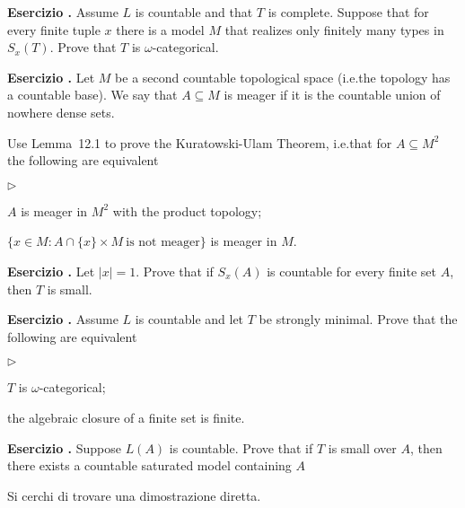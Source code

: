 \documentclass[10pt]{article}
\newcommand{\labella}[1]{{\sf\footnotesize #1}\hfill}
\renewenvironment{itemize}
  {\begin{list}{$\triangleright$}{%
   \setlength{\parskip}{0mm}
   \setlength{\topsep}{0mm}
   \setlength{\rightmargin}{0mm}
   \setlength{\listparindent}{0mm}
   \setlength{\itemindent}{0mm}
   \setlength{\labelwidth}{3ex}
   \setlength{\itemsep}{0mm}
   \setlength{\parsep}{0mm}
   \setlength{\partopsep}{0mm}
   \setlength{\labelsep}{1ex}
   \setlength{\leftmargin}{\labelwidth+\labelsep}
   \let\makelabel\labella}}{%
   \end{list}}
\newcounter{ex}
\newenvironment{exercise}{\clearpage\addtocounter{ex}{1}\textbf{Esercizio \theex.\quad}}{}
\begin{document}
\begin{exercise} 
Assume $L$ is countable and that $T$ is complete.
Suppose that for every finite tuple $x$ there is a model $M$ that realizes only finitely many types in $S_x(T)$.
Prove that $T$ is $\omega$-categorical.
\end{exercise}


\clearpage%
\setcounter{ex}{0}


\begin{exercise}
Let $M$ be a second countable topological space (i.e.\@ the topology has a countable base).
We say that $A\subseteq M$ is meager if it is the countable union of nowhere dense sets.

Use Lemma~12.1 to prove the Kuratowski-Ulam Theorem, i.e.\@ that for $A\subseteq M^2$ the following are equivalent
\begin{itemize}
\item[1.] $A$ is meager in $M^2$  with the product topology;
\item[2.] $\Big\{x\in M : A\cap \{x\}{\times}M \ \textrm{is not meager}\Big\}$ is meager in $M$.
\end{itemize}
\end{exercise}



\begin{exercise}
Let $|x|=1$.
Prove that if $S_x(A)$ is countable for every finite set $A$, then $T$ is small.
\end{exercise}



\begin{exercise} 
Assume $L$ is countable and let $T$ be strongly minimal.
Prove that the following are equivalent
\begin{itemize}
\item[1.] $T$ is $\omega$-categorical;
\item[2.] the algebraic closure of a finite set is finite.
\end{itemize}
\end{exercise}


\clearpage%
\setcounter{ex}{0}


\begin{exercise}
Suppose $L(A)$ is countable.
Prove that if $T$ is small over $A$, then there exists a countable saturated model containing $A$

Si cerchi di trovare una dimostrazione diretta.
\end{exercise}
\end{document}
